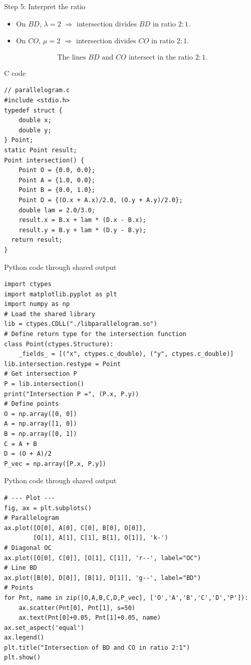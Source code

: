 \documentclass{beamer}
\begin{document}
\begin{frame}{Step 5: Interpret the ratio}
\begin{itemize}
\item On \(BD\), \(\lambda = 2\) \(\Rightarrow\) intersection divides \(BD\) in ratio \(2:1\).  
\item On \(CO\), \(\mu = 2\) \(\Rightarrow\) intersection divides \(CO\) in ratio \(2:1\).  
\end{itemize}

\begin{align}
\boxed{\text{The lines $BD$ and $CO$ intersect in the ratio } 2:1.}
\end{align}
\end{frame}






\begin{frame}[fragile]{C code}
\begin{lstlisting}
// parallelogram.c
#include <stdio.h>
typedef struct {
    double x;
    double y;
} Point;
static Point result;
Point intersection() {
    Point O = {0.0, 0.0};
    Point A = {1.0, 0.0};
    Point B = {0.0, 1.0};
    Point D = {(O.x + A.x)/2.0, (O.y + A.y)/2.0};
    double lam = 2.0/3.0;
    result.x = B.x + lam * (D.x - B.x);
    result.y = B.y + lam * (D.y - B.y);
  return result;
}
\end{lstlisting}
\end{frame}
\begin{frame}[fragile]{Python code through shared output}
\begin{lstlisting}
import ctypes
import matplotlib.pyplot as plt
import numpy as np
# Load the shared library
lib = ctypes.CDLL("./libparallelogram.so")
# Define return type for the intersection function
class Point(ctypes.Structure):
    _fields_ = [("x", ctypes.c_double), ("y", ctypes.c_double)]
lib.intersection.restype = Point
# Get intersection P
P = lib.intersection()
print("Intersection P =", (P.x, P.y))
# Define points
O = np.array([0, 0])
A = np.array([1, 0])
B = np.array([0, 1])
C = A + B
D = (O + A)/2
P_vec = np.array([P.x, P.y])
\end{lstlisting}
\end{frame}
\begin{frame}[fragile]{Python code through shared output}
\begin{lstlisting}
# --- Plot ---
fig, ax = plt.subplots()
# Parallelogram
ax.plot([O[0], A[0], C[0], B[0], O[0]],
        [O[1], A[1], C[1], B[1], O[1]], 'k-')
# Diagonal OC
ax.plot([O[0], C[0]], [O[1], C[1]], 'r--', label="OC")
# Line BD
ax.plot([B[0], D[0]], [B[1], D[1]], 'g--', label="BD")
# Points
for Pnt, name in zip([O,A,B,C,D,P_vec], ['O','A','B','C','D','P']):
    ax.scatter(Pnt[0], Pnt[1], s=50)
    ax.text(Pnt[0]+0.05, Pnt[1]+0.05, name)
ax.set_aspect('equal')
ax.legend()
plt.title("Intersection of BD and CO in ratio 2:1")
plt.show()
\end{lstlisting}
\end{frame}
\end{document}
